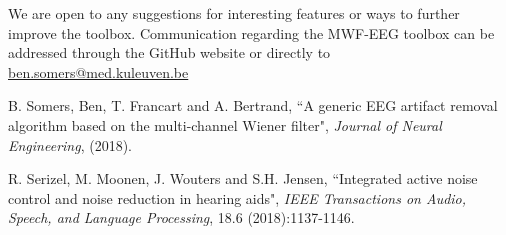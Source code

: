 \documentclass[11pt]{article}
\begin{document}
We are open to any suggestions for interesting features or ways to further improve the toolbox. Communication regarding the MWF-EEG toolbox can be addressed through the GitHub website or directly to \href{mailto:ben.somers@med.kuleuven.be}{ben.somers@med.kuleuven.be}

\begin{thebibliography}{9}

  B. Somers, Ben, T. Francart and A. Bertrand,
  ``A generic EEG artifact removal algorithm based on the multi-channel Wiener filter", 
  \textit{Journal of Neural Engineering},
  (2018).
  
  R. Serizel, M. Moonen, J. Wouters and S.H. Jensen,
  ``Integrated active noise control and noise reduction in hearing aids", 
  \textit{IEEE Transactions on Audio, Speech, and Language Processing},
  18.6 (2018):1137-1146.

\end{thebibliography}
\end{document}
